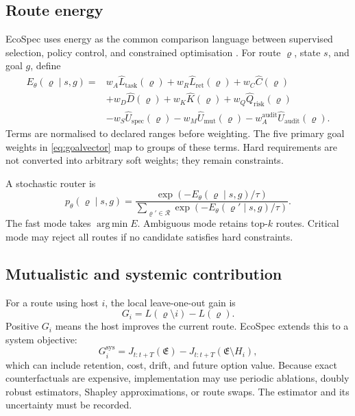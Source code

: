 \documentclass[10pt]{article}
\newcommand{\Rset}{\mathcal{R}}
\newcommand{\argmin}{\operatorname*{arg\,min}}
\begin{document}
\subsection{Route energy}

EcoSpec uses energy as the common comparison language between supervised selection, policy control, and constrained optimisation \citep{lecun2006tutorial}. For route $\varrho$, state $s$, and goal $g$, define
\begin{align}
E_\theta(\varrho\mid s,g) = {}&
  w_A \widehat L_{\mathrm{task}}(\varrho)
 +w_R \widehat L_{\mathrm{ret}}(\varrho)
 +w_C \widehat C(\varrho) \\
&+w_D \widehat D(\varrho)
 +w_K \widehat K(\varrho)
 +w_Q \widehat Q_{\mathrm{risk}}(\varrho) \\
&-w_S \widehat U_{\mathrm{spec}}(\varrho)
 -w_M \widehat U_{\mathrm{mut}}(\varrho)
 -w_A^{\mathrm{audit}}\widehat U_{\mathrm{audit}}(\varrho).
\label{eq:energy}
\end{align}
Terms are normalised to declared ranges before weighting. The five primary goal weights in \cref{eq:goalvector} map to groups of these terms. Hard requirements are not converted into arbitrary soft weights; they remain constraints.

A stochastic router is
\begin{equation}
  p_\theta(\varrho\mid s,g)=
  \frac{\exp(-E_\theta(\varrho\mid s,g)/\tau)}
  {\sum_{\varrho'\in\Rset}\exp(-E_\theta(\varrho'\mid s,g)/\tau)}.
  \label{eq:boltzmann}
\end{equation}
The fast mode takes $\argmin E$. Ambiguous mode retains top-$k$ routes. Critical mode may reject all routes if no candidate satisfies hard constraints.

\subsection{Mutualistic and systemic contribution}

For a route using host $i$, the local leave-one-out gain is
\begin{equation}
  G_i = L(\varrho\setminus i)-L(\varrho).
\end{equation}
Positive $G_i$ means the host improves the current route. EcoSpec extends this to a system objective:
\begin{equation}
  G_i^{\mathrm{sys}} = J_{t:t+T}(\mathfrak E)-J_{t:t+T}(\mathfrak E\setminus H_i),
  \label{eq:systemgain}
\end{equation}
which can include retention, cost, drift, and future option value. Because exact counterfactuals are expensive, implementation may use periodic ablations, doubly robust estimators, Shapley approximations, or route swaps. The estimator and its uncertainty must be recorded.
\end{document}
